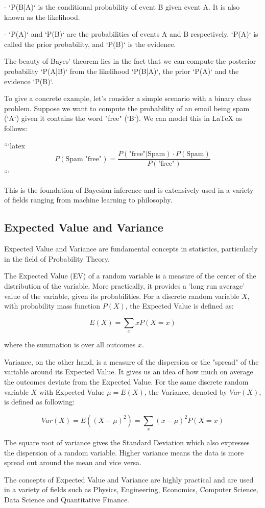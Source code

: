 - `P(B|A)` is the conditional probability of event B given event A. It is also known as the likelihood. 

- `P(A)`  and `P(B)` are the probabilities of events A and B respectively. `P(A)` is called the prior probability, and `P(B)` is the evidence. 

The beauty of Bayes' theorem lies in the fact that we can compute the posterior probability `P(A|B)` from the likelihood `P(B|A)`, the prior `P(A)` and the evidence `P(B)`.

To give a concrete example, let's consider a simple scenario with a binary class problem. Suppose we want to compute the probability of an email being spam (`A`) given it contains the word "free" (`B`). We can model this in LaTeX as follows:

```latex
\begin{equation}
P(\text{{Spam}}|\text{{"free"}}) = \frac{P(\text{{"free"}}|\text{{Spam}}) \cdot P(\text{{Spam}})}{P(\text{{"free"}})}
\end{equation}
```

This is the foundation of Bayesian inference and is extensively used in a variety of fields ranging from machine learning to philosophy.

\subsection{Expected Value and Variance}
Expected Value and Variance are fundamental concepts in statistics, particularly in the field of Probability Theory. 

The Expected Value (EV) of a random variable is a measure of the center of the distribution of the variable. More practically, it provides a 'long run average' value of the variable, given its probabilities. For a discrete random variable $X$, with probability mass function $P(X)$, the Expected Value is defined as:

\begin{equation}
E(X) = \sum_{x} xP(X=x)
\end{equation}

where the summation is over all outcomes $x$.

Variance, on the other hand, is a measure of the dispersion or the "spread" of the variable around its Expected Value. It gives us an idea of how much on average the outcomes deviate from the Expected Value. For the same discrete random variable $X$ with Expected Value $\mu = E(X)$, the Variance, denoted by $Var(X)$, is defined as following:

\begin{equation}
Var(X) = E\left((X-\mu)^2\right) = \sum_{x} (x-\mu)^2 P(X=x)
\end{equation}

The square root of variance gives the Standard Deviation which also expresses the dispersion of a random variable. Higher variance means the data is more spread out around the mean and vice versa.

The concepts of Expected Value and Variance are highly practical and are used in a variety of fields such as Physics, Engineering, Economics, Computer Science, Data Science and Quantitative Finance.

